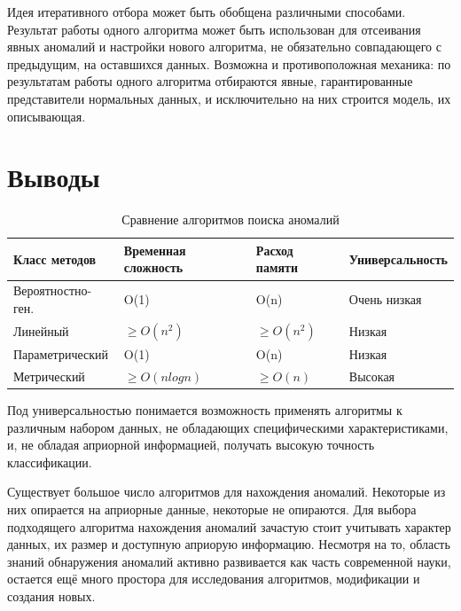 Идея итеративного отбора может быть обобщена различными способами. Результат работы одного алгоритма может быть использован для отсеивания явных аномалий и настройки нового алгоритма, не обязательно совпадающего с предыдущим, на оставшихся данных. Возможна и противоположная механика: по результатам работы одного алгоритма отбираются явные, гарантированные
представители нормальных данных, и исключительно на них строится модель, их описывающая.
\section{Выводы}

\begin{table}[!h]
	
	\caption{\label{tab:collectdata}Сравнение алгоритмов поиска аномалий}
	
	\begin{center}
		
		\begin{tabular}{|l|l|l|l|}
			
			\hline
			
			Класс методов & Временная сложность & Расход памяти & Универсальность \\
			
			\hline \hline
			
			Вероятностно-ген.& O(1) &  O(n) & Очень низкая \\
			
			
			\hline
			
			Линейный &  $\ge O(n^2)$ &  $\ge O(n^2)$ & Низкая\\
			
			
			\hline
			Параметрический & O(1) & O(n) & Низкая\\
			\hline
			Метрический & $\ge O(nlogn)$ & $\ge O(n)$ & Высокая\\
			
			
			\hline
			
			
		\end{tabular}
		
	\end{center}
	
\end{table}                               
Под универсальностью понимается возможность применять алгоритмы к различным набором данных, не обладающих специфическими характеристиками, и, не обладая априорной информацией, получать высокую точность классификации.

Существует большое число алгоритмов для нахождения аномалий. Некоторые из них опирается на априорные данные, некоторые не опираются. Для выбора подходящего алгоритма нахождения аномалий зачастую стоит учитывать характер данных, их размер и доступную априорую информацию. Несмотря на то, область знаний обнаружения аномалий активно развивается как часть современной науки, остается ещё много простора для исследования алгоритмов, модификации и создания новых.


